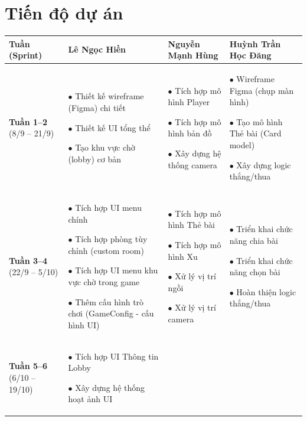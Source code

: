 \section{Tiến độ dự án}

\begin{longtable}{|p{2cm}|p{4cm}|p{4cm}|p{4cm}|}
\hline
\textbf{Tuần (Sprint)} & \textbf{Lê Ngọc Hiền} & \textbf{Nguyễn Mạnh Hùng} & \textbf{Huỳnh Trần Học Đăng} \\
\hline

\textbf{Tuần 1--2} \newline (8/9 -- 21/9)
&
    $\bullet$ Thiết kế wireframe (Figma) chi tiết
    
    $\bullet$ Thiết kế UI tổng thể
    
    $\bullet$ Tạo khu vực chờ (lobby) cơ bản
&
    $\bullet$ Tích hợp mô hình Player
    
    $\bullet$ Tích hợp mô hình bản đồ
    
    $\bullet$ Xây dựng hệ thống camera
&
    $\bullet$ Wireframe Figma (chụp màn hình)
    
    $\bullet$ Tạo mô hình Thẻ bài (Card model)
    
    $\bullet$ Xây dựng logic thắng/thua
\\
\hline

\textbf{Tuần 3--4} \newline (22/9 -- 5/10)
&
    $\bullet$ Tích hợp UI menu chính
    
    $\bullet$ Tích hợp phòng tùy chỉnh (custom room)
    
    $\bullet$ Tích hợp UI menu khu vực chờ trong game
    
    $\bullet$ Thêm cấu hình trò chơi (GameConfig - cấu hình UI)
&
    $\bullet$ Tích hợp mô hình Thẻ bài
    
    $\bullet$ Tích hợp mô hình Xu
    
    $\bullet$ Xử lý vị trí ngồi
    
    $\bullet$ Xử lý vị trí camera
&
    $\bullet$ Triển khai chức năng chia bài
    
    $\bullet$ Triển khai chức năng chọn bài
    
    $\bullet$ Hoàn thiện logic thắng/thua
\\
\hline

\textbf{Tuần 5--6} \newline (6/10 -- 19/10)
&
    $\bullet$ Tích hợp UI Thông tin Lobby
    
    $\bullet$ Xây dựng hệ thống hoạt ảnh UI
    

\end{longtable}

